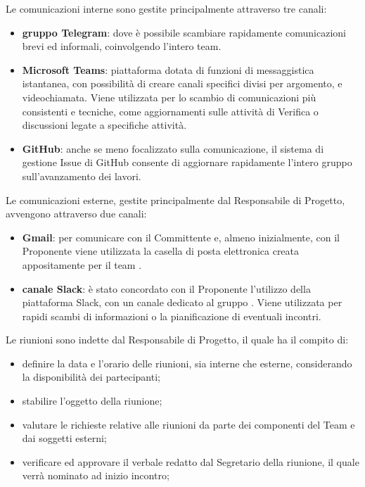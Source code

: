 			Le comunicazioni interne sono gestite principalmente attraverso tre canali:
			\begin{itemize}
				\item \textbf{gruppo Telegram}: dove è possibile scambiare rapidamente comunicazioni brevi ed informali, coinvolgendo l'intero team.
				\item \textbf{Microsoft Teams}: piattaforma dotata di funzioni di messaggistica istantanea, con possibilità di creare canali specifici divisi per argomento, e videochiamata. Viene utilizzata per lo scambio di comunicazioni più consistenti e tecniche, come aggiornamenti sulle attività di Verifica o discussioni legate a specifiche attività.
				\item \textbf{GitHub}: anche se meno focalizzato sulla comunicazione, il sistema di gestione Issue di GitHub consente di aggiornare rapidamente l'intero gruppo sull'avanzamento dei lavori.
			\end{itemize}
			Le comunicazioni esterne, gestite principalmente dal Responsabile di Progetto, avvengono attraverso due canali:
			\begin{itemize}
				\item \textbf{Gmail}: per comunicare con il Committente e, almeno inizialmente, con il Proponente viene utilizzata la casella di posta elettronica creata appositamente per il team \Gruppo{}.
				\item \textbf{canale Slack}: è stato concordato con il Proponente \Proponente{} l'utilizzo della piattaforma Slack, con un canale dedicato al gruppo \Gruppo{}. Viene utilizzata per rapidi scambi di informazioni o la pianificazione di eventuali incontri.
			\end{itemize}
			Le riunioni sono indette dal Responsabile di Progetto, il quale ha il compito di:
			\begin{itemize}
				\item definire la data e l'orario delle riunioni, sia interne che esterne, considerando la disponibilità dei partecipanti;
				\item stabilire l'oggetto della riunione;
				\item valutare le richieste relative alle riunioni da parte dei componenti del Team \Gruppo{} e dai soggetti esterni;
				\item verificare ed approvare il verbale redatto dal Segretario della riunione, il quale verrà nominato ad inizio incontro;
			\end{itemize}
